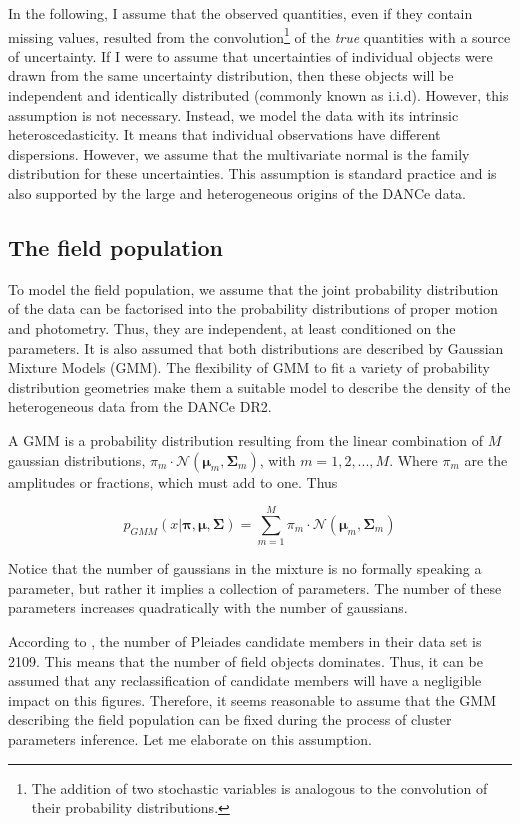 In the following, I assume that the observed quantities, even if they contain missing values, resulted from the convolution\footnote{The addition of two stochastic variables is analogous to the convolution of their probability distributions.} of the \emph{true} quantities with a source of uncertainty. If I were to assume that uncertainties of individual objects were drawn from the same uncertainty distribution, then these objects will be independent and identically distributed (commonly known as i.i.d). However, this assumption is not necessary. Instead, we model the data with its intrinsic heteroscedasticity. It means that individual observations have different dispersions. However, we assume that the multivariate normal is the family distribution for these uncertainties. This assumption is standard practice and is also supported by the large and heterogeneous origins of the DANCe data. 

\subsection{The field population}
To model the field population, we assume that the joint probability distribution of the data can be factorised into the probability distributions of proper motion and photometry. Thus, they are independent, at least conditioned on the parameters. It is also assumed that both distributions are described by Gaussian Mixture Models (GMM). The flexibility of GMM to fit a variety of probability distribution geometries make them a suitable model to describe the density of the heterogeneous data from the DANCe DR2. 

A GMM is a probability distribution resulting from the linear combination of $M$ gaussian distributions, $\pi_m\cdot \mathcal{N}(\boldsymbol{\mu}_m,\boldsymbol{\Sigma}_m)$, with $m=1,2,...,M$. Where $\pi_m$ are the amplitudes or fractions, which must add to one. Thus

\begin{equation}
p_{GMM}(x|\boldsymbol{\pi},\boldsymbol{\mu},\boldsymbol{\Sigma})=\sum_{m=1}^M \pi_m \cdot \mathcal{N}(\boldsymbol{\mu}_m,\boldsymbol{\Sigma}_m)
\end{equation}

Notice that the number of gaussians in the mixture is no formally speaking a parameter, but rather it implies a collection of parameters. The number of these parameters increases quadratically with the number of gaussians. 

According to \citet{Bouy2015}, the number of Pleiades candidate members in their data set is 2109. This means that the number of field objects dominates. Thus, it can be assumed that any reclassification of candidate members will have a negligible impact on this figures. Therefore, it seems reasonable to assume that the GMM describing the field population can be fixed during the process of cluster parameters inference. Let me elaborate on this assumption.


